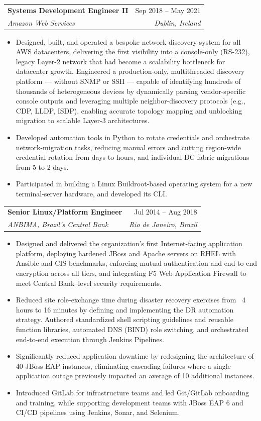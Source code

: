 \documentclass[letterpaper,11pt]{article}
\makeatletter
\newcommand{\resumeItem}[1]{
  \item\small{
    {#1 \vspace{-2pt}}
  }
}
\newcommand{\resumeSubheading}[4]{
  \vspace{-2pt}\item
    \begin{tabular*}{0.97\textwidth}[t]{l@{\extracolsep{\fill}}r}
      \textbf{#1} & #2 \\
      \textit{\small#3} & \textit{\small #4} \\
    \end{tabular*}\vspace{-7pt}
}
\newcommand{\resumeItemListStart}{\begin{itemize}}
\newcommand{\resumeItemListEnd}{\end{itemize}\vspace{-5pt}}
\makeatother
\begin{document}
    \medskip

    \resumeSubheading
      {Systems Development Engineer II}{Sep 2018 -- May 2021}
      {Amazon Web Services}{Dublin, Ireland}
      \resumeItemListStart
        \resumeItem{Designed, built, and operated a bespoke network discovery system for all AWS datacenters, delivering the first visibility into a console-only (RS-232), legacy Layer-2 network that had become a scalability bottleneck for datacenter growth. Engineered a production-only, multithreaded discovery platform — without SNMP or SSH — capable of identifying hundreds of thousands of heterogeneous devices by dynamically parsing vendor-specific console outputs and leveraging multiple neighbor-discovery protocols (e.g., CDP, LLDP, ISDP), enabling accurate topology mapping and unblocking migration to scalable Layer-3 architectures.}
        \resumeItem{Developed automation tools in Python to rotate credentials and orchestrate network-migration tasks, reducing manual errors and cutting region-wide credential rotation from days to hours, and individual DC fabric migrations from 5 to 2 days.}
        \resumeItem{Participated in building a Linux Buildroot-based operating system for a new terminal-server hardware, and developed its CLI.}
      \resumeItemListEnd

    \medskip

    \resumeSubheading
      {Senior Linux/Platform Engineer}{Jul 2014 -- Aug 2018}
      {ANBIMA, Brazil's Central Bank}{Rio de Janeiro, Brazil}
      \resumeItemListStart
        \resumeItem{Designed and delivered the organization’s first Internet-facing application platform, deploying hardened JBoss and Apache servers on RHEL with Ansible and CIS benchmarks, enforcing mutual authentication and end-to-end encryption across all tiers, and integrating F5 Web Application Firewall to meet Central Bank–level security requirements.}
       \resumeItem{Reduced site role-exchange time during disaster recovery exercises from ~4 hours to 16 minutes by defining and implementing the DR automation strategy. Authored standardized shell scripting guidelines and reusable function libraries, automated DNS (BIND) role switching, and orchestrated end-to-end execution through Jenkins Pipelines.}
       \resumeItem{Significantly reduced application downtime by redesigning the architecture of 40 JBoss EAP instances, eliminating cascading failures where a single application outage previously impacted an average of 10 additional instances.}
       \resumeItem{Introduced GitLab for infrastructure teams and led Git/GitLab onboarding and training, while supporting development teams with JBoss EAP 6 and CI/CD pipelines using Jenkins, Sonar, and Selenium.}
     \resumeItemListEnd
\end{document}
